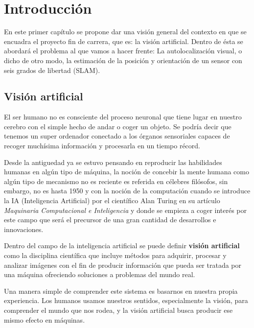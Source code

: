 
\chapter{Introducción} %

\label{Chapter1} %

En este primer capítulo se propone dar una visión general del contexto en que se encuadra el proyecto fin de carrera, que es: la visión artificial. Dentro de ésta se abordará el problema al que vamos a hacer frente: La autolocalización visual, o dicho de otro modo, la estimación de la posición y orientación de un sensor con seis grados de libertad (SLAM).

\section{Visión artificial}

El ser humano no es consciente del proceso neuronal que tiene lugar en nuestro cerebro con el simple hecho de andar o coger un objeto. Se podría decir que tenemos un super ordenador conectado a los órganos sensoriales capaces de recoger muchísima información y procesarla en un tiempo récord.

Desde la antiguedad ya se estuvo pensando en reproducir las habilidades humanas en algún tipo de máquina, la noción de concebir la mente humana como algún tipo de mecanismo no es reciente es referida en célebres filósofos, sin embargo, no es hasta 1950 y con la noción de la computación cuando se introduce la IA (Inteligencia Artificial) por el científico Alan Turing en su artículo \textit{Maquinaria Computacional e Inteligencia} y donde se empieza a coger interés por este campo que será el precursor de una gran cantidad de desarrollos e innovaciones.

Dentro del campo de la inteligencia artificial se puede definir \textbf{visión artificial} como la disciplina científica que incluye métodos para adquirir, procesar y analizar imágenes con el fin de producir información que pueda ser tratada por una máquina ofreciendo soluciones a problemas del mundo real.

Una manera simple de comprender este sistema es basarnos en nuestra propia experiencia. Los humanos usamos nuestros sentidos, especialmente la visión, para comprender el mundo que nos rodea, y la visión artificial busca producir ese mismo efecto en máquinas.

